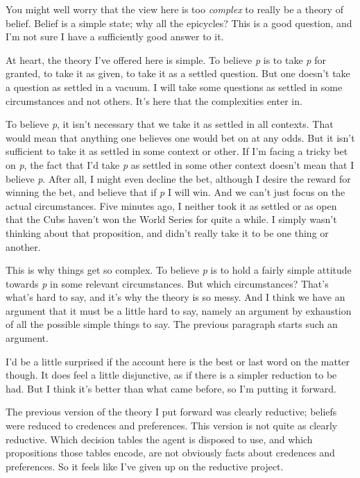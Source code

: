 \documentclass[
  10pt,
  letterpaper,
  DIV=11,
  numbers=noendperiod,
  twoside]{scrartcl}
\begin{document}
You might well worry that the view here is too \emph{complex} to really
be a theory of belief. Belief is a simple state; why all the epicycles?
This is a good question, and I'm not sure I have a sufficiently good
answer to it.

At heart, the theory I've offered here is simple. To believe \emph{p} is
to take \emph{p} for granted, to take it as given, to take it as a
settled question. But one doesn't take a question as settled in a
vacuum. I will take some questions as settled in some circumstances and
not others. It's here that the complexities enter in.

To believe \emph{p}, it isn't necessary that we take it as settled in
all contexts. That would mean that anything one believes one would bet
on at any odds. But it isn't sufficient to take it as settled in some
context or other. If I'm facing a tricky bet on \emph{p}, the fact that
I'd take \emph{p} as settled in some other context doesn't mean that I
believe \emph{p}. After all, I might even decline the bet, although I
desire the reward for winning the bet, and believe that if \emph{p} I
will win. And we can't just focus on the actual circumstances. Five
minutes ago, I neither took it as settled or as open that the Cubs
haven't won the World Series for quite a while. I simply wasn't thinking
about that proposition, and didn't really take it to be one thing or
another.

This is why things get so complex. To believe \emph{p} is to hold a
fairly simple attitude towards \emph{p} in some relevant circumstances.
But which circumstances? That's what's hard to say, and it's why the
theory is so messy. And I think we have an argument that it must be a
little hard to say, namely an argument by exhaustion of all the possible
simple things to say. The previous paragraph starts such an argument.

I'd be a little surprised if the account here is the best or last word
on the matter though. It does feel a little disjunctive, as if there is
a simpler reduction to be had. But I think it's better than what came
before, so I'm putting it forward.

The previous version of the theory I put forward was clearly reductive;
beliefs were reduced to credences and preferences. This version is not
quite as clearly reductive. Which decision tables the agent is disposed
to use, and which propositions those tables encode, are not obviously
facts about credences and preferences. So it feels like I've given up on
the reductive project.
\end{document}
